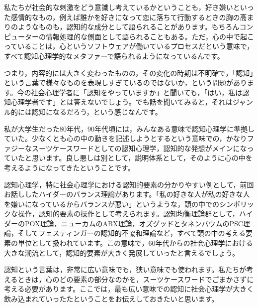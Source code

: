 \documentclass{ltjsbook}
\begin{document}
私たちが社会的な刺激をどう意識し考えているかということも，好き嫌いといった感情的なもの，例えば誰かを好きになって恋に落ちて行動するときの胸の高まりのようなものも，認知的な成分として語られることがあります。もちろんコンピューターの情報処理的な側面として語られることもある。ただ，心の中で起こっていることは，心というソフトウェアが働いているプロセスだという意味で，すべて認知心理学的なメタファーで語られるようになっているんです。

つまり，内容的には大きく変わったものの，その変化の時期は不明確で，「認知」という言葉で様々なものを表現しすぎているのではないか，という問題があります。今の社会心理学者に「認知をやっていますか」と聞いても，「はい，私は認知心理学者です」とは答えないでしょう。でも話を聞いてみると，それはジャンル的には認知になるだろう，という感じなんです。

私が大学生だった80年代，90年代頃には，みんなある意味で認知心理学に準拠していた。少なくとも心の中の動きを記述しようとするという意味での，かなりファジーなスーツケースワードとしての認知心理学，認知的な発想がメインになっていたと思います。良し悪しは別として，説明体系として，そのように心の中を考えるようになってきたということです。

認知心理学，特に社会心理学における認知的要素の分かりやすい例として，前回お話ししたハイダーのバランス理論があります。「私の好きな人が私の好きな人を嫌いになっているからバランスが悪い」というような，頭の中でのシンボリックな操作，認知的要素の操作として考えられます。認知均衡理論群として，ハイダーのPOX理論，ニューカムのABX理論，オズグッドとタネンバウムのPSC理論，そしてフェスティンガーの認知的不協和理論など，すべて頭の中の考える要素の単位として扱われています。この意味で，60年代からの社会心理学における大きな潮流として，認知的要素が大きく発展していったと言えるでしょう。

認知という言葉は，非常に広い意味でも，狭い意味でも使われます。私たちが考えるときは，心のどの要素の部分なのかを，スーツケースワードでごまかさずに考える必要があります。ここでは，最も広い意味での認知に社会心理学が大きく飲み込まれていったたということをお伝えしておきたいと思います。
\end{document}

